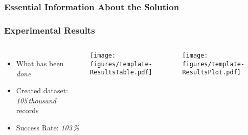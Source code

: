   \begin{frame}\frametitle{Essential Information About the Solution}
  \end{frame}
  
  
  
  \begin{frame}
    \frametitle{Experimental Results}
    \begin{columns}
      \begin{itemize}
        \item What has been \emph{done}
        \item Created dataset: \emph{105\,thousand} records
        \item Success Rate: \emph{103\,\%}
      \end{itemize}
      
      \centering
      \texttt{[image: figures/template-ResultsTable.pdf]}
      
      \bigskip
      \texttt{[image: figures/template-ResultsPlot.pdf]}
      
    \end{columns}
  \end{frame}
  
  
  
